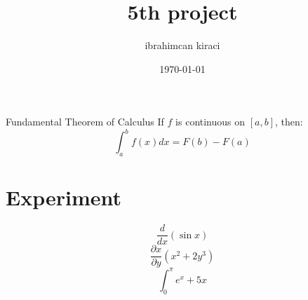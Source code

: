 \documentclass{article}
\title{5th project}
\author{ibrahimcan kiraci}
\date{\today}
\newcommand{\dv}[1]{\frac{d}{d#1}}
\newcommand{\pdv}[2]{\frac{\partial #1}{\partial #2}}
\newcommand{\bint}[2]{\int_{#1}^{#2}}
\begin{document}
\begin{mybox}{Fundamental Theorem of Calculus}
If $f$ is continuous on $[a, b]$, then:
$$\bint{a}{b} f(x) dx = F(b) - F(a)$$
\end{mybox}

\maketitle
\thispagestyle{fancy}
\section{Experiment}

$$\dv{x}(\sin x)$$
$$\pdv{x}{y}(x^2 + 2y^3)$$
$$\bint{0}{\pi}e^x +5x$$
\end{document}
